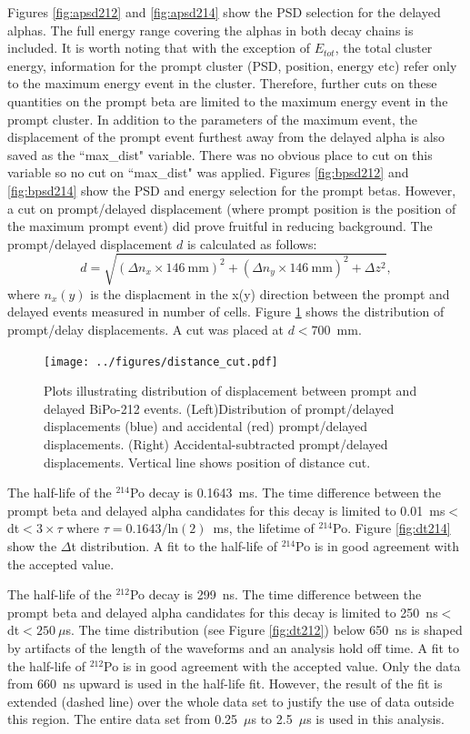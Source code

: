 Figures \ref{fig:apsd212} and \ref{fig:apsd214} show the PSD selection for the delayed alphas. The full energy range covering the alphas in both decay chains is included.
It is worth noting that with the exception of $E_{tot}$, the total cluster energy, information for the prompt cluster (PSD, position, energy etc) refer only to the maximum energy event in the cluster. Therefore, further cuts on these quantities on the prompt beta are limited to the maximum energy event in the prompt cluster. In addition to the parameters of the maximum event, the displacement of the prompt event furthest away from the delayed alpha is also saved as the ``max\_dist" variable. There was no obvious place to cut on this variable so no cut on ``max\_dist" was applied. Figures \ref{fig:bpsd212} and \ref{fig:bpsd214} show the PSD and energy selection for the prompt betas. 
However, a cut on prompt/delayed displacement (where prompt position is the position of the maximum prompt event) did prove fruitful in reducing background. The prompt/delayed displacement $d$ is calculated as follows:
\[
d=\sqrt{(\Delta n_x\times 146~\textrm{mm})^2+(\Delta n_y\times146~\textrm{mm})^2 + \Delta z^2},
\]
where $n_x(y)$ is the displacment in the x(y) direction between the prompt and delayed events measured in number of cells. Figure \ref{fig:deltaD} shows the distribution of prompt/delay displacements. A cut was placed at $d<700$~mm.
\begin{figure}[ht]
\centering
\texttt{[image: ../figures/distance\_cut.pdf]}
\caption{\label{fig:deltaD}Plots illustrating distribution of displacement between prompt and delayed BiPo-212 events. (Left)Distribution of prompt/delayed displacements (blue) and accidental (red) prompt/delayed displacements. (Right) Accidental-subtracted prompt/delayed displacements. Vertical line shows position of distance cut.}
\end{figure}

The half-life of the $^{214}$Po decay is 0.1643~ms. The time difference between the prompt beta and delayed alpha candidates for this decay is limited to 0.01~ms$<$dt$<3\times\tau$ where $\tau=0.1643/\textrm{ln}(2)$~ms, the lifetime of $^{214}$Po. Figure \ref{fig:dt214} show the $\Delta$t distribution. A fit to the half-life of $^{214}$Po is in good agreement with the accepted value.

The half-life of the $^{212}$Po decay is 299~ns. The time difference between the prompt beta and delayed alpha candidates for this decay is limited to 250~ns$<$dt$<250~\mu$s. The time distribution (see Figure \ref{fig:dt212}) below 650~ns is shaped by artifacts of the length of the waveforms and an analysis hold off time.  A fit to the half-life of $^{212}$Po is in good agreement with the accepted value. Only the data from 660~ns upward is used in the half-life fit. However, the result of the fit is extended (dashed line) over the whole data set to justify the use of data outside this region. The entire data set from 0.25~$\mu$s to 2.5~$\mu$s is used in this analysis. 

